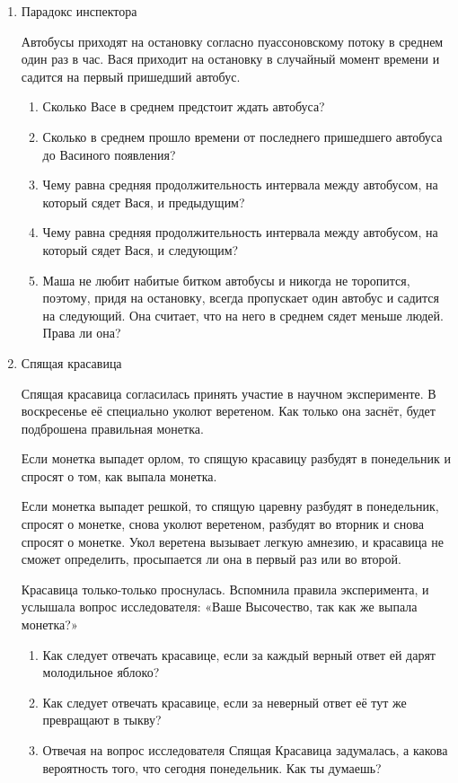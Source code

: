 \documentclass[nobib]{tufte-handout}
\begin{document}
\begin{enumerate}
\item Парадокс инспектора

Автобусы приходят на остановку согласно пуассоновскому потоку в среднем один раз в час. Вася приходит на остановку в случайный момент времени и садится на первый пришедший автобус. 

\begin{enumerate}
\item Сколько Васе в среднем предстоит ждать автобуса?
\item Сколько в среднем прошло времени от последнего пришедшего автобуса до Васиного появления?
\item Чему равна средняя продолжительность интервала между автобусом, на который сядет Вася, и предыдущим?
\item Чему равна средняя продолжительность интервала между автобусом, на который сядет Вася, и следующим?
\item Маша не любит набитые битком автобусы и никогда не торопится, поэтому, придя на остановку, всегда пропускает один автобус и садится на следующий. Она считает, что на него в среднем сядет меньше людей. Права ли она?
\end{enumerate}

\item Спящая красавица

Спящая красавица согласилась принять участие в научном
эксперименте. В воскресенье её специально уколют веретеном. Как
только она заснёт, будет подброшена правильная монетка. 


Если
монетка выпадет орлом, то спящую красавицу разбудят в понедельник
и спросят о том, как выпала монетка. 


Если монетка выпадет решкой,
то спящую царевну разбудят в понедельник, спросят о монетке, снова
уколют веретеном, разбудят во вторник и снова спросят о монетке.
Укол веретена вызывает легкую амнезию, и красавица не сможет
определить, просыпается ли она в первый раз или во второй.


Красавица только-только проснулась. Вспомнила правила эксперимента, и услышала вопрос исследователя: «Ваше Высочество, так как же выпала монетка?»
\begin{enumerate}
\item Как следует отвечать красавице, если за каждый верный ответ ей
дарят молодильное яблоко?
\item Как следует отвечать красавице, если за неверный ответ её тут
же превращают в тыкву?
\item Отвечая на вопрос исследователя Спящая Красавица задумалась, а какова вероятность того, что сегодня понедельник. Как ты думаешь?
\end{enumerate}




\end{enumerate}
\end{document}
